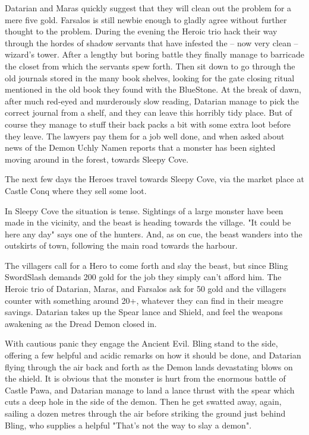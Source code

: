 Datarian and Maras quickly suggest that they will clean out the problem for a mere five gold. Farsalos is still newbie enough to gladly agree without further thought to the problem.
During the evening the Heroic trio hack their way through the hordes of shadow servants that have infested the -- now very clean -- wizard's tower. After a lengthy but boring battle they finally manage to barricade the closet from which the servants spew forth. Then sit down to go through the old journals stored in the many book shelves, looking for the gate closing ritual mentioned in the old book they found with the BlueStone. At the break of dawn, after much red-eyed and murderously slow reading, Datarian manage to pick the correct journal from a shelf, and they can leave this horribly tidy place.
But of course they manage to stuff their back packs a bit with some extra loot before they leave.
The lawyers pay them for a job well done, and when asked about news of the Demon Uchly Namen reports that a monster has been sighted moving around in the forest, towards Sleepy Cove.

The next few days the Heroes travel towards Sleepy Cove, via the market place at Castle Conq where they sell some loot.

In Sleepy Cove the situation is tense. Sightings of a large monster have been made in the vicinity, and the beast is heading towards the village. "It could be here any day" says one of the hunters.
And, as on cue, the beast wanders into the outskirts of town, following the main road towards the harbour.

The villagers call for a Hero to come forth and slay the beast, but since Bling SwordSlash demands 200 gold for the job they simply can't afford him. The Heroic trio of Datarian, Maras, and Farsalos ask for 50 gold and the villagers counter with something around 20+, whatever they can find in their meagre savings.
Datarian takes up the Spear lance and Shield, and feel the weapons awakening as the Dread Demon closed in.

With cautious panic they engage the Ancient Evil. Bling stand to the side, offering a few helpful and acidic remarks on how it should be done, and Datarian flying through the air back and forth as the Demon lands devastating blows on the shield.
It is obvious that the monster is hurt from the enormous battle of Castle Pawa, and Datarian manage to land a lance thrust with the spear which cuts a deep hole in the side of the demon. Then he get swatted away, again, sailing a dozen metres through the air before striking the ground just behind Bling, who supplies a helpful "That's not the way to slay a demon".

